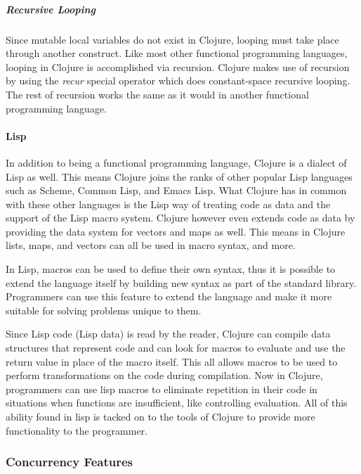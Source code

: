     \subparagraph{Recursive Looping}
    
    Since mutable local variables do not exist in Clojure, looping must take place through another construct. Like most other functional programming languages, looping in Clojure is accomplished via recursion. Clojure makes use of recursion by using the \textit{recur} special operator which does constant-space recursive looping. The rest of recursion works the same as it would in another functional programming language. \cite{clojure_website:functional-programming}

\paragraph{Lisp}

    In addition to being a functional programming language, Clojure is a dialect of Lisp as well. This means Clojure joins the ranks of other popular Lisp languages such as Scheme, Common Lisp, and Emacs Lisp. What Clojure has in common with these other languages is the Lisp way of treating code as data and the support of the Lisp macro system. Clojure however even extends code as data by providing the data system for vectors and maps as well. This means in Clojure lists, maps, and vectors can all be used in macro syntax, and more.
    
    In Lisp, macros can be used to define their own syntax, thus it is possible to extend the language itself by building new syntax as part of the standard library. Programmers can use this feature to extend the language and make it more suitable for solving problems unique to them.  \cite{PracticalCommonLisp_Book_PeterSeibel}
    
    Since Lisp code (Lisp data) is read by the reader, Clojure can compile data structures that represent code and can look for macros to evaluate and use the return value in place of the macro itself. This all allows macros to be used to perform transformations on the code during compilation. Now in Clojure, programmers can use lisp macros to eliminate repetition in their code in situations when functions are insufficient, like controlling evaluation. All of this ability found in lisp is tacked on to the tools of Clojure to provide more functionality to the programmer.
    \cite{clojure_website:lisp}

\subsubsection{Concurrency Features}


